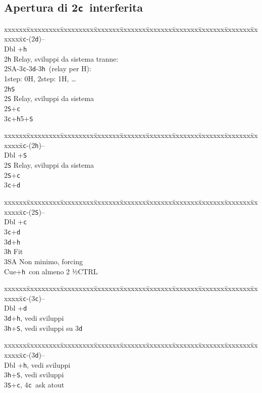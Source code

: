 \documentclass[a4paper,italian]{article}
\newcommand{\BS}{\small{\texttt{S}}}
\newcommand{\BC}{\small{\texttt{c}}}
\newcommand{\BD}{\small{\texttt{d}}}
\newcommand{\BH}{\small{\texttt{h}}}
\newcommand{\pdfc}{\texorpdfstring{\texttt{c}}{C}}
\newenvironment{bidtable}
{\begin{tabbing}

    xxxxxx\=xxxxxxxxx\=xxxxxxxxx\=xxxxxxx\=xxxxxxx\=xxxxxxx\=xxxxxxx\=xxxxxxx\=xxxxxxx\=xxxxxxx\=\kill}
{\end{tabbing} }%
\begin{document}
\begin{multicols}{2}

    \subsection{Apertura di 2\pdfc\ interferita}

    \begin{bidtable}
        2\BC-(2\BD)--\+\\
        Dbl +\BH\+\\
        2\BH\> Relay, sviluppi da sistema tranne:
        \+\\
        2\small{SA}-3\BC-3\BD-3\BH\ (relay per H):\\
        1step: 0H, 2step: 1H, \dots\-\-\\
        2\BH{}\BS\+\\
        2\BS\> Relay, sviluppi da sistema\-\\
        2\BS{}+\BC\\
        3\BC{}+\BH5+\BS\\
    \end{bidtable}
    \begin{bidtable}
        2\BC-(2\BH)--\+\\
        Dbl +\BS\+\\
        2\BS\> Relay, sviluppi da sistema\-\\
        2\BS{}+\BC\\
        3\BC{}+\BD\\
    \end{bidtable}
    \begin{bidtable}
        2\BC-(2\BS)--\+\\
        Dbl +\BC\\
        3\BC{}+\BD\\
        3\BD {}+\BH\+\\
        3\BH\> Fit\+\\
        3\small{SA}\> Non minimo, forcing\\
        Cue+\BH\ con almeno 2 ½CTRL\-\-\\
    \end{bidtable}
    \begin{bidtable}
        2\BC-(3\BC)--\+\\
        Dbl +\BD\\
        3\BD {}+\BH, vedi sviluppi\\
        3\BH {}+\BS, vedi sviluppi su 3\BD\\
    \end{bidtable}
    \begin{bidtable}
        2\BC-(3\BD)--\+\\
        Dbl +\BH, vedi sviluppi\\
        3\BH {}+\BS, vedi sviluppi\\
        3\BS {}+\BC, 4\BC\ ask atout
    \end{bidtable}
\end{multicols}
\end{document}
